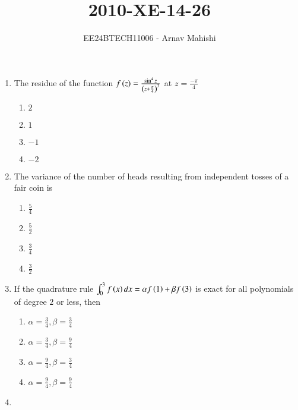 \documentclass[journal]{IEEEtran}
\begin{document}

\vspace{3cm}

\title{2010-XE-14-26}
\author{EE24BTECH11006 - Arnav Mahishi}
{\let\newpage\relax\maketitle}
\begin{enumerate}
\item{
The residue of the function $f\left(z\right)=\frac{\sin^4z}{\left(z+\frac{\pi}{4}\right)^3}$ at $z=\frac{-\pi}{4}$
\begin{multicols}{4}
\begin{enumerate}
\item $2$
\item $1$
\item $-1$ 
\item $-2$
\end{enumerate}
\end{multicols}
}
\item{
The variance of the number of heads resulting from independent tosses of a fair coin is
\begin{multicols}{2}
\begin{enumerate}
\item $\frac{5}{4}$ 
\item $\frac{5}{2}$
\item $\frac{3}{4}$
\item $\frac{3}{2}$
\end{enumerate}
\end{multicols}}
\item{
If the quadrature rule $\int_0^3f\left(x\right)dx=\alpha f\left(1\right)+\beta f\left(3\right)$ is exact for all polynomials of degree $2$ or less, then
\begin{multicols}{4}
\begin{enumerate}
\item $\alpha=\frac{3}{4},\beta=\frac{3}{4}$
\item $\alpha=\frac{3}{4},\beta=\frac{9}{4}$
\item $\alpha=\frac{9}{4},\beta=\frac{3}{4}$
\item $\alpha=\frac{9}{4},\beta=\frac{9}{4}$
\end{enumerate}
\end{multicols}
}
\item{
}
\end{enumerate}
\end{document}
